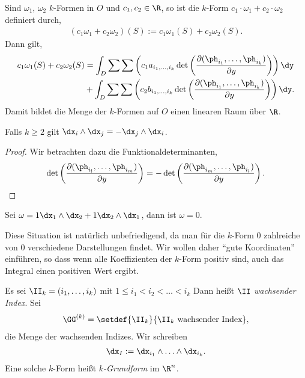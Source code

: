 \begin{prop}
\label{4.30}
Sind $\omega_1$, $\omega_2$ $k$-Formen in $O$ und $c_1,c_2\in\R$, so ist die
$k$-Form $c_1\cdot\omega_1 + c_2\cdot\omega_2$ definiert durch,
\begin{align*}
(c_1 \omega_1 + c_2\omega_2)(S) := c_1 \omega_1(S) + c_2 \omega_2(S).
\end{align*}
Dann gilt,
\begin{align*}
c_1\omega_1(S) + c_2\omega_2(S) &= \int_D \sum\sum \left( c_1
a_{i_1,\ldots,i_k}
\det\left(\frac{\partial(\ph_{i_1},\ldots,\ph_{i_k})}{\partial y} \right)
\right) \dy \\
&+ \int_D \sum\sum \left( c_2
b_{i_1,\ldots,i_k}
\det\left(\frac{\partial(\ph_{i_1},\ldots,\ph_{i_k})}{\partial y} \right)
\right) \dy.
\end{align*}
Damit bildet die Menge der $k$-Formen auf $O$ einen linearen Raum über
$\R$.\fishhere
\end{prop}

\begin{cor}
\label{prop:4.31}
Falls $k\ge 2$ gilt $\dx_i\land \dx_j = - \dx_j \land \dx_i$.\fishhere
\end{cor}
\begin{proof}
Wir betrachten dazu die Funktionaldeterminanten,
\begin{align*}
\det\left(\frac{\partial(\ph_{i_l},\ldots,\ph_{i_m})}{\partial y} \right)
= - \det\left(\frac{\partial(\ph_{i_m},\ldots,\ph_{i_l})}{\partial y}
\right).\qedhere
\end{align*}
\end{proof}

\begin{bsp}
\label{bsp:4.32}
Sei $\omega = 1\dx_1\land\dx_2 + 1\dx_2\land\dx_1$, dann ist $\omega =
0$.\bsphere
\end{bsp}

Diese Situation ist natürlich unbefriedigend, da man für die $k$-Form $0$
zahlreiche von $0$ verschiedene Darstellungen findet. Wir wollen daher ``gute
Koordinaten'' einführen, so dass wenn alle Koeffizienten der $k$-Form positiv
sind, auch das Integral einen positiven Wert ergibt.

\begin{defn}
\label{defn:4.33}
Es sei $\II_k = (i_1,\ldots,i_k)$ mit $1\le i_1 < i_2 <\ldots <i_k$ Dann heißt
$\II$ \emph{wachsender Index}. Sei
\begin{align*}
\GG^{(k)} = \setdef{\II_k}{\II_k \text{ wachsender Index}},
\end{align*}
die Menge der wachsenden Indizes. Wir schreiben
\begin{align*}
\dx_I := \dx_{i_1}\land \ldots \land \dx_{i_k}.
\end{align*}
Eine solche $k$-Form heißt \emph{$k$-Grundform} im $\R^n$.\fishhere
\end{defn}

